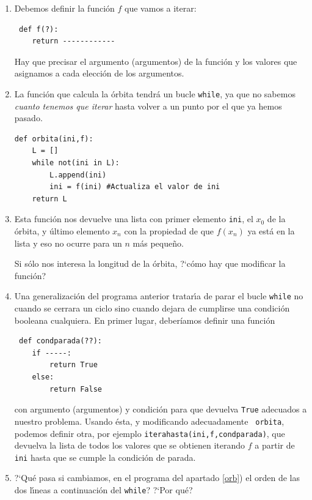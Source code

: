 \begin{enumerate}

\item Debemos definir la funci\'on $f$ que vamos a iterar:
\begin{lstlisting}
 def f(?):
    return ------------
\end{lstlisting}

Hay que precisar el argumento (argumentos) de la funci\'on y los
valores que asignamos a cada elecci\'on de los argumentos.

\item \label{orb}La funci\'on que calcula la \'orbita tendr\'a un
bucle {\tt while}, ya que no sabemos {\itshape cuanto tenemos que iterar} hasta
volver a un punto por el que ya hemos pasado. 
\begin{lstlisting}
def orbita(ini,f):
    L = []
    while not(ini in L):
        L.append(ini)
        ini = f(ini) #Actualiza el valor de ini
    return L
\end{lstlisting}
\item Esta funci\'on nos devuelve una lista con primer elemento \lstinline|ini|,
el
$x_0$ de la \'orbita, y \'ultimo elemento $x_n$ con la propiedad de que
$f(x_n)$ ya est\'a en la lista y eso no ocurre para un $n$ m\'as peque\~no.

Si s\'olo nos interesa la longitud de la \'orbita,  ?`c\'omo hay que modificar
la funci\'on? 

\item Una generalizaci\'on del programa anterior tratar\'{\i}a de parar el bucle
{\tt while} no cuando 
se cerrara un ciclo sino cuando dejara de cumplirse una condici\'on booleana
cualquiera. En primer lugar, deber\'iamos definir una funci\'on 
\begin{lstlisting}
 def condparada(??):
    if -----:
        return True
    else:
        return False
\end{lstlisting}
\noindent con argumento (argumentos) y condici\'on para que devuelva {\tt True}
adecuados a nuestro problema. Usando \'esta, y modi\-ficando adecuadamente {\tt
orbita},  podemos definir otra, por ejemplo
\lstinline|iterahasta(ini,f,condparada)|, que
devuelva la lista de todos los valores que se obtienen iterando $f$ a partir de
\lstinline|ini| hasta que se cumple la condici\'on de parada. 

\item ?`Qu\'e pasa si cambiamos, en el programa del apartado \ref{orb})  el
orden de las dos l\'{\i}neas a continuaci\'on
del \lstinline|while|? ?`Por qu\'e?
\label{func-orbita}

\end{enumerate}

